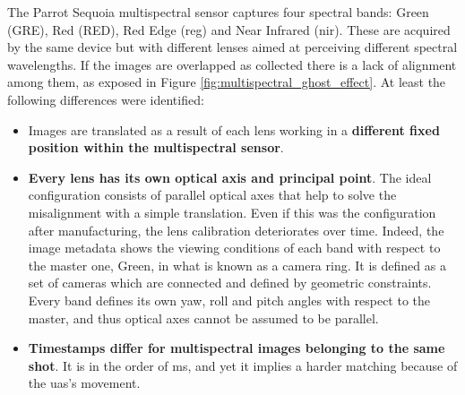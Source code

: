 The Parrot Sequoia multispectral sensor captures four spectral bands: Green (GRE), Red (RED), Red Edge (\acrshort{reg}) and Near Infrared (\acrshort{nir}). These are acquired by the same device but with different lenses aimed at perceiving different spectral wavelengths. If the images are overlapped as collected there is a lack of alignment among them, as exposed in Figure \ref{fig:multispectral_ghost_effect}. At least the following differences were identified: 
\begin{itemize}
    \item Images are translated as a result of each lens working in a \textbf{different fixed position within the multispectral sensor}. 
    \item \textbf{Every lens has its own optical axis and principal point}. The ideal configuration consists of parallel optical axes that help to solve the misalignment with a simple translation. Even if this was the configuration after manufacturing, the lens calibration deteriorates over time. Indeed, the image metadata shows the viewing conditions of each band with respect to the master one, Green, in what is known as a camera ring. It is defined as a set of cameras which are connected and defined by geometric constraints. Every band defines its own yaw, roll and pitch angles with respect to the master, and thus optical axes cannot be assumed to be parallel.
    \item \textbf{Timestamps differ for multispectral images belonging to the same shot}. It is in the order of \si{\milli\second}, and yet it implies a harder matching because of the \acrshort{uas}'s movement.
\end{itemize}

